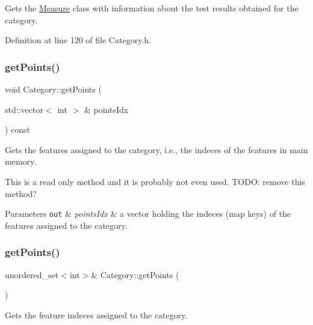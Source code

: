 Gets the \hyperlink{class_measure}{Measure} class with information about the test results obtained for the category. 

Definition at line 120 of file Category.\+h.

\mbox{\label{class_category_ad1816cec49d0c93cdc394f3c9292ecbb}} 
\subsubsection{\texorpdfstring{get\+Points()}{getPoints()}\hspace{0.1cm}{\footnotesize\ttfamily [1/2]}}
{\footnotesize\ttfamily void Category\+::get\+Points (\begin{DoxyParamCaption}\item[{std\+::vector$<$ int $>$ \&}]{points\+Idx }\end{DoxyParamCaption}) const}

Gets the features assigned to the category, i.\+e., the indeces of the features in main memory.

This is a read only method and it is probably not even used. T\+O\+DO\+: remove this method?


\begin{DoxyParams}[1]{Parameters}
\mbox{\tt out}  & {\em points\+Idx} & a vector holding the indeces (map keys) of the features assigned to the category. \\
\hline
\end{DoxyParams}
\mbox{\label{class_category_af7bf3e19fc53d93b8c0d88974a03227c}} 
\subsubsection{\texorpdfstring{get\+Points()}{getPoints()}\hspace{0.1cm}{\footnotesize\ttfamily [2/2]}}
{\footnotesize\ttfamily unordered\+\_\+set$<$int$>$\& Category\+::get\+Points (\begin{DoxyParamCaption}{ }\end{DoxyParamCaption})\hspace{0.3cm}{\ttfamily [inline]}}

Gets the feature indeces assigned to the category. 

